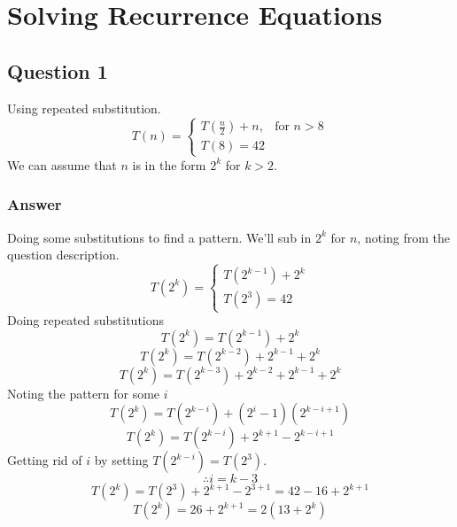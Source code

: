 \documentclass[12pt]{article}
\begin{document}
\maketitle

\section{Solving Recurrence Equations}
\subsection{Question 1}
Using repeated substitution.
\begin{displaymath} 
	T(n)=
	\begin{cases}
		T(\frac{n}{2})+n, & \text{for } n>8 \\
		T(8) = 42
	\end{cases}
\end{displaymath}
We can assume that $ n $ is in the form $ 2^k $ for $ k > 2 $.

\subsubsection{Answer}
Doing some substitutions to find a pattern.
We'll sub in $ 2^k $ for $ n $, noting from the question description.
\begin{displaymath}
	T(2^k)=
	\begin{cases}
		T(2^{k-1})+2^k \\
		T(2^3)=42
	\end{cases}
\end{displaymath}
Doing repeated substitutions
\begin{displaymath}
	T(2^k)=T(2^{k-1})+2^k
\end{displaymath}
\begin{displaymath}
	T(2^k)=T(2^{k-2})+2^{k-1}+2^k
\end{displaymath}
\begin{displaymath}
	T(2^k)=T(2^{k-3})+2^{k-2}+2^{k-1}+2^k
\end{displaymath}
Noting the pattern for some $i$
\begin{displaymath}
	T(2^k)=T(2^{k-i})+(2^i-1)(2^{k-i+1})
\end{displaymath}
\begin{displaymath}
	T(2^k)=T(2^{k-i})+2^{k+1}-2^{k-i+1}
\end{displaymath}
Getting rid of $i$ by setting $ T(2^{k-i})=T(2^3) $.
\begin{displaymath}
	\therefore i=k-3
\end{displaymath}
\begin{displaymath}
	T(2^k)=T(2^3)+2^{k+1}-2^{3+1}=42-16+2^{k+1}
\end{displaymath}
\begin{displaymath}
	T(2^k)=26+2^{k+1}=2(13+2^k)
\end{displaymath}
\end{document}
